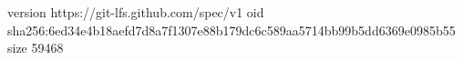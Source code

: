 version https://git-lfs.github.com/spec/v1
oid sha256:6ed34e4b18aefd7d8a7f1307e88b179dc6c589aa5714bb99b5dd6369e0985b55
size 59468
